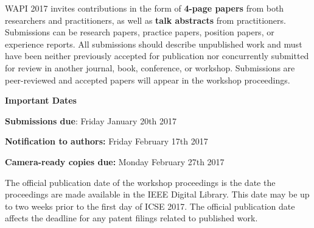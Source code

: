 \documentclass[10pt, conference]{IEEEtran}
\newcommand{\shortname}{WAPI}
\begin{document}
\shortname{} 2017 invites contributions in the form of \textbf{4-page papers} from both researchers and practitioners, as well as \textbf{talk abstracts} from practitioners. Submissions can be research papers, practice papers, position papers, or experience reports. All submissions should describe unpublished work and must have been neither previously accepted for publication nor concurrently submitted for review in another journal, book, conference, or workshop. Submissions are peer-reviewed and accepted papers will appear in the workshop proceedings.

\vspace{0.2cm}
\noindent
\textbf{\large Important Dates}
\vspace{0.2cm}

\textbf{Submissions due}: Friday January 20th 2017

\textbf{Notification to authors:} Friday February 17th 2017

\textbf{Camera-ready copies due:} Monday February 27th 2017

\vspace{0.2cm}

The official publication date of the workshop proceedings is the date the proceedings are made available in the IEEE Digital Library. This date may be up to two weeks prior to the first day of ICSE 2017. The official publication date affects the deadline for any patent filings related to published work.
\end{document}
